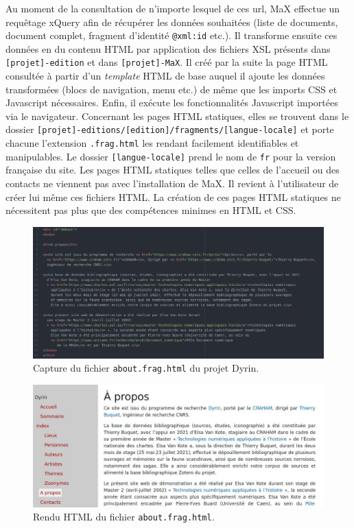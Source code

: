\documentclass[a4paper,12pt,twoside]{book}
\begin{document}
Au moment de la consultation de n'importe lesquel de ces url, MaX effectue un requêtage xQuery afin de récupérer les données souhaitées (liste de documents, document complet, fragment d'identité \texttt{@xml:id} etc.). Il transforme ensuite ces données en du contenu \acrshort{HTML} par application des fichiers \acrshort{XSL} présents dans \texttt{[projet]-edition} et dans \texttt{[projet]-MaX}. Il créé par la suite la page \acrshort{HTML} consultée à partir d'un \textit{template} \acrshort{HTML} de base auquel il ajoute les données transformées (blocs de navigation, menu etc.) de même que les imports \acrshort{CSS} et Javascript nécessaires. Enfin, il exécute les fonctionnalités Javascript importées via le navigateur.  
Concernant les pages \acrshort{HTML} statiques, elles se trouvent dans le dossier \texttt{[projet]-editions/[edition]/fragments/[langue-locale]} et porte chacune l'extension \texttt{.frag.html} les rendant facilement identifiables et manipulables. Le dossier \texttt{[langue-locale]} prend le nom de \texttt{fr} pour la version française du site. Les pages \acrshort{HTML} statiques telles que celles de l'accueil ou des contacts ne viennent pas avec l'installation de MaX. Il revient à l'utilisateur de créer lui même ces fichiers \acrshort{HTML}. La création de ces pages \acrshort{HTML} statiques ne nécessitent pas plus que des compétences minimes en \acrshort{HTML} et CSS.

\begin{figure}[H]
    \centering
    \includegraphics[width=\linewidth]{img/partie_2/a_propos_max.JPG}
    \caption{Capture du fichier \texttt{about.frag.html} du projet Dyrin.}
\end{figure}

\begin{figure}[H]
    \centering
    \includegraphics[width=\linewidth]{img/partie_2/a_propos_html.JPG}
    \caption{Rendu \acrshort{HTML} du fichier \texttt{about.frag.html}.}
\end{figure}
\end{document}
